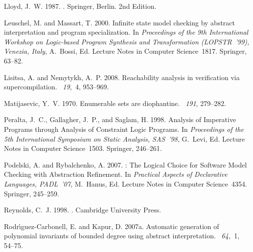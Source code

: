 \documentclass[english]{tlp}
\begin{document}
\begin{thebibliography}{}
{\sc Lloyd, J.~W.} 1987.
.
\newblock Springer, Berlin. 
\newblock 2nd Edition.

{\sc Leuschel, M.} {\sc and} {\sc Massart, T.} 2000.
\newblock Infinite state model checking by abstract interpretation and program
  specialization.
\newblock In {\em Proceedings of the 9th International Workshop on Logic-based
  Program Synthesis and Transformation (LOPSTR~'99), Venezia, Italy},
  {A.~Bossi}, Ed. Lecture Notes in Computer Science~1817. Springer, 63--82.

{\sc Lisitsa, A.} {\sc and} {\sc Nemytykh, A.~P.} 2008.
\newblock Reachability analysis in verification via supercompilation.
~{\em 19,\/}~4, 953--969.

{\sc Matijasevic, Y.~V.} 1970.
\newblock Enumerable sets are diophantine.
~{\em 191}, 279--282.

{\sc Peralta, J.~C.}, {\sc Gallagher, J.~P.}, {\sc and} {\sc Saglam, H.} 1998.
\newblock Analysis of {I}mperative {P}rograms through {A}nalysis of
  {C}onstraint {L}ogic {P}rograms.
\newblock In {\em Proceedings of the 5th {I}nternational {S}ymposium on
  {S}tatic {A}nalysis, {SAS}~'98}, {G.~{L}evi}, Ed. Lecture Notes in Computer
  Science~1503. Springer, 246--261.

{\sc Podelski, A.} {\sc and} {\sc Rybalchenko, A.} 2007.
: {T}he {L}ogical {C}hoice for {S}oftware {M}odel {C}hecking
  with {A}bstraction {R}efinement.
\newblock In {\em Practical Aspects of Declarative Languages, {PADL}~'07},
  {M.~Hanus}, Ed. Lecture Notes in Computer Science~4354. Springer, 245--259.

{\sc Reynolds, C.~J.} 1998.
.
\newblock Cambridge University Press.

{\sc Rodr{\'{\i}}guez{-}Carbonell, E.} {\sc and} {\sc Kapur, D.} 2007a.
\newblock Automatic generation of polynomial invariants of bounded degree using
  abstract interpretation.
~{\em 64,\/}~1, 54--75.


\end{thebibliography}
\end{document}
